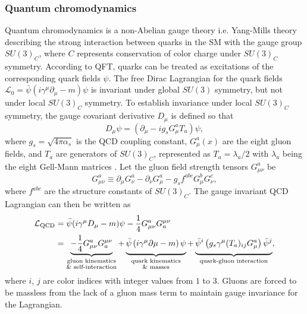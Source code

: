 \documentclass[../thesis.tex]{subfiles}
\begin{document}
\subsubsection{Quantum chromodynamics}
\label{sec:qcd}
Quantum chromodynamics is a non-Abelian gauge theory i.e. Yang-Mills theory \citep{theory:yangmills,theory:yangmills2} describing the strong interaction between quarks in the \acs{SM} with the gauge group $SU(3)_C$, where $C$ represents conservation of color charge under $SU(3)_C$ symmetry. According to \acs{QFT}, quarks can be treated as excitations of the corresponding quark fields $\psi$.
The free Dirac Lagrangian for the quark fields $\mathcal{L}_0=\bar{\psi}(i\gamma^\mu\partial_\mu-m)\psi$ is invariant under global $SU(3)$ symmetry, but not under local $SU(3)_C$ symmetry.
To establish invariance under local $SU(3)_C$ symmetry, the gauge covariant derivative $D_\mu$ is defined so that
\begin{equation}
D_\mu \psi = (\partial_\mu-ig_sG^a_\mu T_a)\psi,
\end{equation}
where $g_s=\sqrt{4\pi\alpha_s}$ is the \acs{QCD} coupling constant, $G^a_\mu(x)$ are the eight gluon fields, and $T_a$ are generators of $SU(3)_C$, represented as $T_a=\lambda_a/2$ with $\lambda_a$ being the eight Gell-Mann matrices \citep{theory:gellmann}.
Let the gluon field strength tensors $G^a_{\mu \nu}$ be
\begin{equation}
G_{\mu \nu}^a \equiv \partial_\mu G^a_\nu - \partial_\nu G^a_\mu - g_s f^{abc} G^b_\mu G^c_\nu,
\end{equation}
where $f^{abc}$ are the structure constants of $SU(3)_C$. The gauge invariant \acs{QCD} Lagrangian can then be written as
\begin{equation}
\begin{aligned}
\mathcal{L}_\text{QCD}
&=\bar{\psi}(i\gamma^\mu D_\mu-m)\psi - \frac{1}{4} G_{\mu \nu}^a G_a^{\mu \nu} \\
&= 
\underbrace{
-\frac{1}{4} G_{\mu \nu}^a G_a^{\mu \nu}
}_{\substack{\text{gluon kinematics}\\ \text{\& self-interaction}}}
+\underbrace{\vphantom{\frac{1}{4}}
\bar{\psi}\left( i\gamma^\mu \partial\mu-m \right)\psi
}_{\substack{\text{quark kinematics}\\ \text{\& masses}}}
+\underbrace{\vphantom{\frac{1}{4}}
\bar{\psi}^i\left( g_s \gamma^\mu (T_a)_{ij} G^a_\mu \right)\bar{\psi}^j
}_\text{quark-gluon interaction},
\end{aligned}
\end{equation}
where $i$, $j$ are color indices with integer values from $1$ to $3$. Gluons are forced to be massless from the lack of a gluon mass term to maintain gauge invariance for the Lagrangian.
\end{document}
